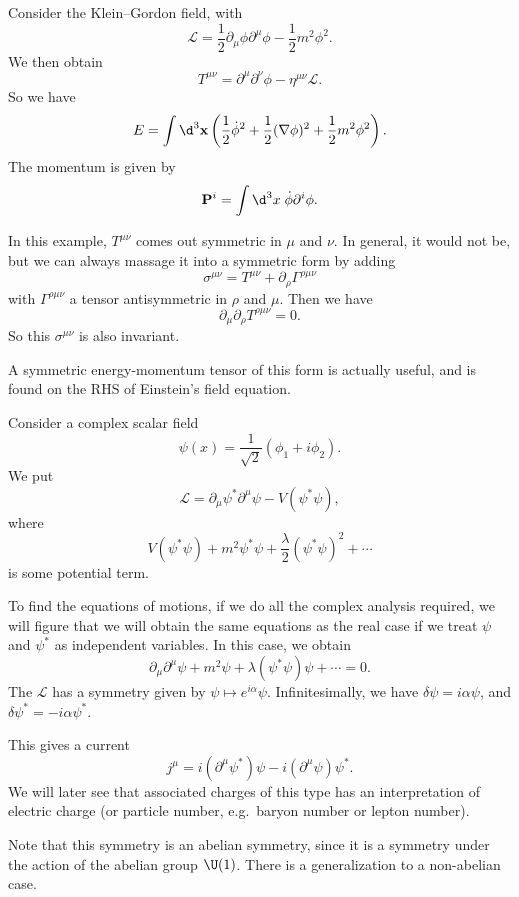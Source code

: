 \documentclass[a4paper]{article}
\begin{document}
\begin{eg}
  Consider the Klein--Gordon field, with
  \[
    \mathcal{L} = \frac{1}{2} \partial_\mu \phi \partial^\mu \phi - \frac{1}{2}m^2 \phi^2.
  \]
  We then obtain
  \[
    T^{\mu\nu} = \partial^\mu \partial^\nu \phi - \eta^{\mu\nu} \mathcal{L}.
  \]
  So we have
  \[
    E = \int \d^3 \mathbf{x} \left(\frac{1}{2}\dot{\phi}^2 + \frac{1}{2}(\nabla \phi)^2 + \frac{1}{2}m^2 \phi^2\right).
  \]
  The momentum is given by
  \[
    \mathbf{P}^i = \int\d^3 x\; \dot{\phi} \partial^i \phi.
  \]
\end{eg}
In this example, $T^{\mu\nu}$ comes out symmetric in $\mu$ and $\nu$. In general, it would not be, but we can always massage it into a symmetric form by adding
\[
  \sigma^{\mu\nu} = T^{\mu\nu} + \partial_\rho \Gamma^{\rho\mu\nu}
\]
with $\Gamma^{\rho\mu\nu}$ a tensor antisymmetric in $\rho$ and $\mu$. Then we have
\[
  \partial_\mu \partial_\rho T^{\rho\mu\nu} = 0.
\]
So this $\sigma^{\mu\nu}$ is also invariant.

A symmetric energy-momentum tensor of this form is actually useful, and is found on the RHS of Einstein's field equation.

\begin{eg}
  Consider a complex scalar field
  \[
    \psi(x) = \frac{1}{\sqrt{2}} (\phi_1 + i \phi_2).
  \]
  We put
  \[
    \mathcal{L} = \partial_\mu \psi^* \partial^\mu \psi - V(\psi^*\psi),
  \]
  where
  \[
    V (\psi^*\psi) + m^2 \psi^* \psi + \frac{\lambda}{2}(\psi^*\psi)^2 + \cdots
  \]
  is some potential term.

  To find the equations of motions, if we do all the complex analysis required, we will figure that we will obtain the same equations as the real case if we treat $\psi$ and $\psi^*$ as independent variables. In this case, we obtain
  \[
    \partial_\mu \partial^\mu \psi + m^2 \psi + \lambda (\psi^*\psi) \psi + \cdots = 0.
  \]
  The $\mathcal{L}$ has a symmetry given by $\psi \mapsto e^{i\alpha} \psi$. Infinitesimally, we have $\delta \psi = i\alpha \psi$, and $\delta \psi^* = -i\alpha \psi^*$.

  This gives a current
  \[
    j^\mu = i(\partial^\mu \psi^*) \psi - i (\partial^\mu \psi)\psi^*.
  \]
  We will later see that associated charges of this type has an interpretation of electric charge (or particle number, e.g.\ baryon number or lepton number).
\end{eg}

Note that this symmetry is an abelian symmetry, since it is a symmetry under the action of the abelian group $\U(1)$. There is a generalization to a non-abelian case.
\end{document}
